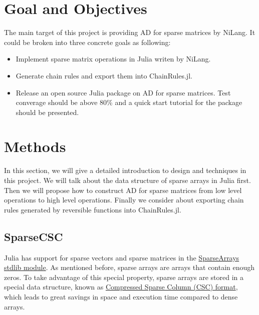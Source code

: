 \section{Goal and Objectives}
\label{sec:goals}
The main target of this project is providing AD for sparse matrices by NiLang. It could be broken into three concrete goals as following:
\begin{itemize}
    \item Implement sparse matrix operations in Julia writen by NiLang.
    \item Generate chain rules and export them into ChainRules.jl.
    \item Release an open source Julia package on AD for sparse matrices. Test converage should be above 80\% and a quick start tutorial for the package should be presented.
\end{itemize} 

\section{Methods}
In this section, we will give a detailed introduction to design and techniques in this project. We will talk about the data structure of sparse arrays in Julia first. Then we will propose how to construct AD for sparse matrices from low level operations to high level operations. Finally we consider about exporting chain rules generated by reversible functions into ChainRules.jl. 
\subsection{SparseCSC}
Julia has support for sparse vectors and sparse matrices in the \href{https://docs.julialang.org/en/v1/stdlib/SparseArrays/}{SparseArrays stdlib module}. As mentioned before, sparse arrays are arrays that contain enough zeros. To take advantage of this special property, sparse arrays are stored in a special data structure, known as  \href{https://en.wikipedia.org/wiki/Sparse_matrix#Compressed_sparse_column_.28CSC_or_CCS.29}{Compressed Sparse Column (CSC) format}, which leads to great savings in space and execution time compared to dense arrays.

